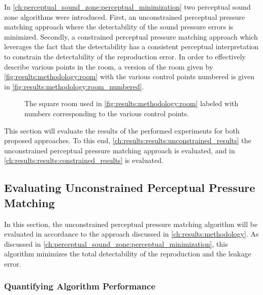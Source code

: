 In \autoref{ch:perceptual_sound_zone:perceptual_minimization} two perceptual sound zone algorithms were introduced. 
First, an unconstrained perceptual pressure matching approach where the detectability of the sound pressure errors is minimized.
Secondly, a constrained perceptual pressure matching approach which leverages the fact that the detectability has a consistent 
perceptual interpretation to constrain the detectability of the reproduction error.
In order to effectively describe various points in the room, a version of the room given by \autoref{fig:results:methodology:room}
with the various control points numbered is given in \autoref{fig:results:methodology:room_numbered}.

\begin{figure}[]
    \centering
    \scalebox{1.0}{}
    \caption{The square room used in \autoref{fig:results:methodology:room} labeled with numbers corresponding to the various control points.}
    \label{fig:results:methodology:room_numbered}
\end{figure}

This section will evaluate the results of the performed experiments for both proposed approaches.
To this end, \autoref{ch:results:results:unconstrained_results} the unconstrained perceptual pressure matching approach is evaluated, and 
in \autoref{ch:results:results:constrained_results} is evaluated.

\subsection{Evaluating Unconstrained Perceptual Pressure Matching}
\label{ch:results:results:unconstrained_results}
In this section, the unconstrained perceptual pressure matching algorithm will be evaluated in accordance to the 
approach discussed in \autoref{ch:results:methodology}.
As discussed in \autoref{ch:perceptual_sound_zone:perceptual_minimization}, 
this algorithm minimizes the total detectability of the reproduction and the leakage error.

\subsubsection*{Quantifying Algorithm Performance}

